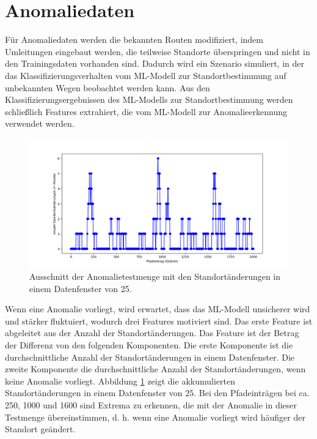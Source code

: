 \section{Anomaliedaten}
\label{sec:data_anomalie}
Für Anomaliedaten werden die bekannten Routen modifiziert, indem Umleitungen eingebaut werden, die teilweise Standorte überspringen
und nicht in den Trainingsdaten vorhanden sind.
Dadurch wird ein Szenario simuliert, in der das Klassifizierungsverhalten vom ML-Modell zur Standortbestimmung auf unbekannten Wegen beobachtet werden kann.
Aus den Klassifizierungsergebnissen des ML-Modells zur Standortbestimmung werden schließlich Features extrahiert,
die vom ML-Modell zur Anomalieerkennung verwendet werden.
\begin{figure}[h!]
    \centering
    \includegraphics[width=\linewidth]{images/feature_window_location_changes.png}
    \caption{Ausschnitt der Anomalietestmenge mit den Standortänderungen in einem Datenfenster von 25.}
    \label{fig:window_location_changes}
\end{figure}
\newpage
Wenn eine Anomalie vorliegt, wird erwartet, dass das ML-Modell unsicherer wird und stärker fluktuiert,
wodurch drei Features motiviert sind.
Das erste Feature ist abgeleitet aus der Anzahl der Standortänderungen.
Das Feature ist der Betrag der Differenz von den folgenden Komponenten.
Die erste Komponente ist die durchschnittliche Anzahl der Standortänderungen in einem Datenfenster.
Die zweite Komponente die durchschnittliche Anzahl der Standortänderungen, wenn keine Anomalie vorliegt.
Abbildung \ref{fig:window_location_changes} zeigt die akkumulierten Standortänderungen in einem Datenfenster von 25.
Bei den Pfadeinträgen bei ca. 250, 1000 und 1600 sind Extrema zu erkennen, die mit der Anomalie in dieser Testmenge übereinstimmen,
d. h. wenn eine Anomalie vorliegt wird häufiger der Standort geändert.
\newline
\newline
